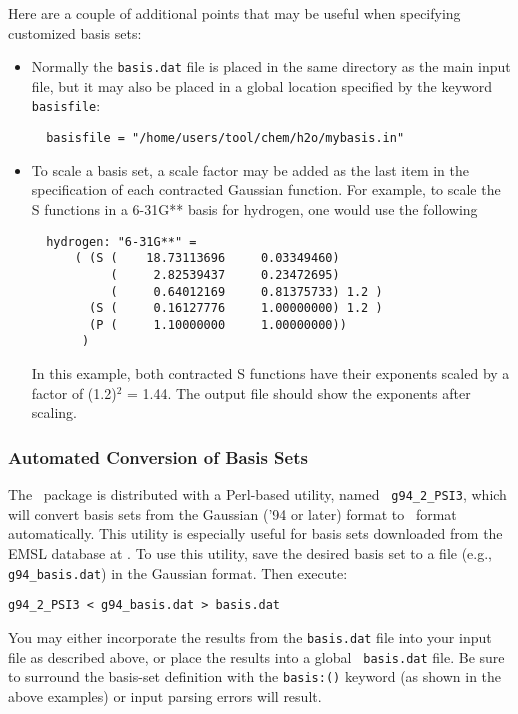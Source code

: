 Here are a couple of additional points that may be useful when
specifying customized basis sets:
\begin{itemize}
\item Normally the {\tt basis.dat} file is placed in the same
directory as the main input file, but it may also be placed in a
global location specified by the keyword {\tt basisfile}:
\begin{verbatim}
  basisfile = "/home/users/tool/chem/h2o/mybasis.in"
\end{verbatim}
\item To scale a basis set, a scale factor may be added as the last item
in the specification of each contracted Gaussian function.  For
example, to scale the S functions in a 6-31G** basis for hydrogen,
one would use the following
\begin{verbatim}
  hydrogen: "6-31G**" =
      ( (S (    18.73113696     0.03349460)
           (     2.82539437     0.23472695)
           (     0.64012169     0.81375733) 1.2 )
        (S (     0.16127776     1.00000000) 1.2 )
        (P (     1.10000000     1.00000000))
       )
\end{verbatim}
In this example, both contracted S functions have their exponents
scaled by a factor of (1.2)$^2$ = 1.44.  The output file should show
the exponents after scaling.
\end{itemize}

\subsubsection{Automated Conversion of Basis Sets}

The \PSIthree\ package is distributed with a Perl-based utility, named {\tt
g94\_2\_PSI3}, which will convert basis sets from the Gaussian ('94 or later)
format to \PSIthree\ format automatically.  This utility is especially useful
for basis sets downloaded from the EMSL database at .
To use this utility, save the desired basis set to a file (e.g., {\tt
g94\_basis.dat}) in the Gaussian format.  Then execute:
\begin{verbatim}
g94_2_PSI3 < g94_basis.dat > basis.dat
\end{verbatim}
You may either incorporate the results from the {\tt basis.dat} file into
your input file as described above, or place the results into a global {\tt
basis.dat} file.  Be sure to surround the basis-set definition with the
{\tt basis:()} keyword (as shown in the above examples) or input parsing
errors will result.

